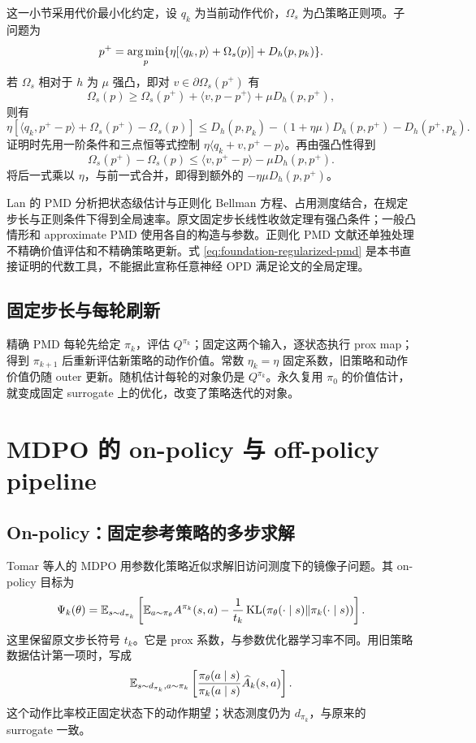 这一小节采用代价最小化约定，设 $q_k$ 为当前动作代价，$\Omega_s$ 为凸策略正则项。子问题为
\[
 p^+=\operatorname*{arg\,min}_p\{\eta[\langle q_k,p\rangle+\Omega_s(p)]+D_h(p,p_k)\}.
\]
若 $\Omega_s$ 相对于 $h$ 为 $\mu$ 强凸，即对 $v\in\partial\Omega_s(p^+)$ 有
\[
 \Omega_s(p)\geq\Omega_s(p^+)+\langle v,p-p^+\rangle+\mu D_h(p,p^+),
\]
则有
\begin{equation}
 \eta[\langle q_k,p^+-p\rangle+\Omega_s(p^+)-\Omega_s(p)]
 \leq D_h(p,p_k)-(1+\eta\mu)D_h(p,p^+)-D_h(p^+,p_k).
 \label{eq:foundation-regularized-pmd}
\end{equation}
证明时先用一阶条件和三点恒等式控制 $\eta\langle q_k+v,p^+-p\rangle$。再由强凸性得到
\[
 \Omega_s(p^+)-\Omega_s(p)\leq\langle v,p^+-p\rangle-\mu D_h(p,p^+).
\]
将后一式乘以 $\eta$，与前一式合并，即得到额外的 $-\eta\mu D_h(p,p^+)$。

Lan 的 PMD 分析把状态级估计与正则化 Bellman 方程、占用测度结合，在规定步长与正则条件下得到全局速率。原文固定步长线性收敛定理有强凸条件；一般凸情形和 approximate PMD 使用各自的构造与参数。正则化 PMD 文献还单独处理不精确价值评估和不精确策略更新。式 \eqref{eq:foundation-regularized-pmd} 是本书直接证明的代数工具，不能据此宣称任意神经 OPD 满足论文的全局定理。\cite{lan23,zhan2022}

\subsection{固定步长与每轮刷新}

精确 PMD 每轮先给定 $\pi_k$，评估 $Q^{\pi_k}$；固定这两个输入，逐状态执行 prox map；得到 $\pi_{k+1}$ 后重新评估新策略的动作价值。常数 $\eta_k=\eta$ 固定系数，旧策略和动作价值仍随 outer 更新。随机估计每轮的对象仍是 $Q^{\pi_k}$。永久复用 $\pi_0$ 的价值估计，就变成固定 surrogate 上的优化，改变了策略迭代的对象。

\section{MDPO 的 on-policy 与 off-policy pipeline}

\subsection{On-policy：固定参考策略的多步求解}

Tomar 等人的 MDPO 用参数化策略近似求解旧访问测度下的镜像子问题。其 on-policy 目标为\cite{mdpo20}
\begin{equation}
 \Psi_k(\theta)=\mathbb{E}_{s\sim d_{\pi_k}}
 \left[\mathbb{E}_{a\sim\pi_\theta}A^{\pi_k}(s,a)
 -\frac1{t_k}\operatorname{KL}(\pi_\theta(\cdot\mid s)\Vert\pi_k(\cdot\mid s))\right].
 \label{eq:foundation-mdpo}
\end{equation}
这里保留原文步长符号 $t_k$。它是 prox 系数，与参数优化器学习率不同。用旧策略数据估计第一项时，写成
\[
 \mathbb{E}_{s\sim d_{\pi_k},a\sim\pi_k}
 \left[\frac{\pi_\theta(a\mid s)}{\pi_k(a\mid s)}\widehat A_k(s,a)\right].
\]
这个动作比率校正固定状态下的动作期望；状态测度仍为 $d_{\pi_k}$，与原来的 surrogate 一致。

